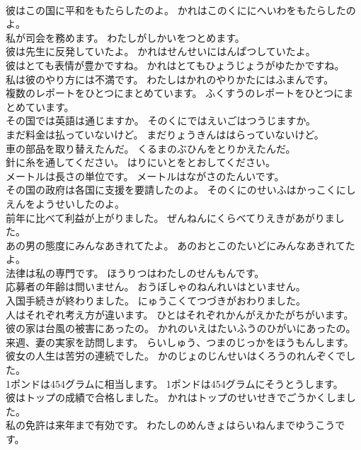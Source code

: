 \documentclass[8pt]{extreport}
\begin{document}
\begin{CJK}{UTF8}{min}
\\	彼はこの国に平和をもたらしたのよ。	かれはこのくににへいわをもたらしたのよ。 
\\	私が司会を務めます。	わたしがしかいをつとめます。 
\\	彼は先生に反発していたよ。	かれはせんせいにはんぱつしていたよ。 
\\	彼はとても表情が豊かですね。	かれはとてもひょうじょうがゆたかですね。 
\\	私は彼のやり方には不満です。	わたしはかれのやりかたにはふまんです。 
\\	複数のレポートをひとつにまとめています。	ふくすうのレポートをひとつにまとめています。 
\\	その国では英語は通じますか。	そのくにではえいごはつうじますか。 
\\	まだ料金は払っていないけど。	まだりょうきんははらっていないけど。 
\\	車の部品を取り替えたんだ。	くるまのぶひんをとりかえたんだ。 
\\	針に糸を通してください。	はりにいとをとおしてください。 
\\	メートルは長さの単位です。	メートルはながさのたんいです。 
\\	その国の政府は各国に支援を要請したのよ。	そのくにのせいふはかっこくにしえんをようせいしたのよ。 
\\	前年に比べて利益が上がりました。	ぜんねんにくらべてりえきがあがりました。 
\\	あの男の態度にみんなあきれてたよ。	あのおとこのたいどにみんなあきれてたよ。 
\\	法律は私の専門です。	ほうりつはわたしのせんもんです。 
\\	応募者の年齢は問いません。	おうぼしゃのねんれいはといません。 
\\	入国手続きが終わりました。	にゅうこくてつづきがおわりました。 
\\	人はそれぞれ考え方が違います。	ひとはそれぞれかんがえかたがちがいます。 
\\	彼の家は台風の被害にあったの。	かれのいえはたいふうのひがいにあったの。 
\\	来週、妻の実家を訪問します。	らいしゅう、つまのじっかをほうもんします。 
\\	彼女の人生は苦労の連続でした。	かのじょのじんせいはくろうのれんぞくでした。 
\\	1ポンドは454グラムに相当します。	1ポンドは454グラムにそうとうします。 
\\	彼はトップの成績で合格しました。	かれはトップのせいせきでごうかくしました。 
\\	私の免許は来年まで有効です。	わたしのめんきょはらいねんまでゆうこうです。 

\end{CJK}
\end{document}
